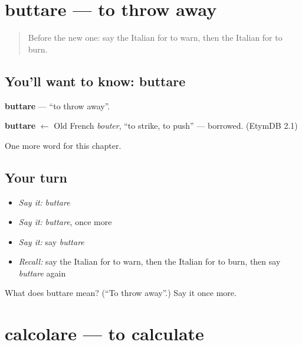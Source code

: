 \section[buttare]{buttare — to throw away}

\label{lesson:IT-C237-buttare}



\begin{quote}
Before the new one: say the Italian for to warn, then the Italian for to burn.
\end{quote}

\subsection*{You'll want to know: buttare}
\textbf{buttare} — \textquotedblleft{}to throw away\textquotedblright{}.

\begin{cousinweb}
\textbf{buttare} $\leftarrow$ Old French \emph{bouter}, \textquotedblleft{}to strike, to push\textquotedblright{} — borrowed. (EtymDB 2.1)
\end{cousinweb}

\begin{grammarlens}[title={What you've built}]
One more word for this chapter.
\end{grammarlens}

\subsection*{Your turn}
\begin{itemize}
\raggedright
  \item \emph{Say it:} \emph{buttare}
  \item \emph{Say it:} \emph{buttare}, once more
  \item \emph{Say it:} say \emph{buttare}
  \item \emph{Recall:} say the Italian for to warn, then the Italian for to burn, then say \emph{buttare} again
\end{itemize}

\begin{tcolorbox}[breakable,colback=teal!4,colframe=teal!35!black,title={Before you move on}]
What does buttare mean? (\textquotedblleft{}To throw away\textquotedblright{}.) Say it once more.
\end{tcolorbox}
\section[calcolare]{calcolare — to calculate}

